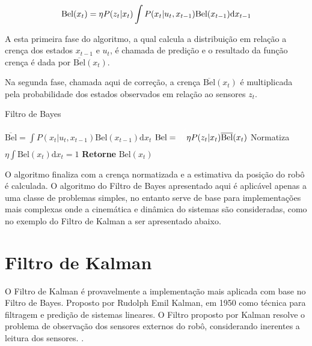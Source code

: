 \begin{equation}
    \label{eq:bayes2}
    \text{\text{Bel}}(x_t) = \eta P(z_t| x_t) \int P(x_t| u_t, x_{t-1}) \text{Bel}(x_{t-1})\text{d}x_{t-1}
\end{equation}


A esta primeira fase do algoritmo, a qual calcula a distribuição em relação a crença dos estados $x_{t-1}$ e $u_t$, é chamada de predição e o resultado da função crença é dada por $\overline{\text{Bel}}(x_t)$.

Na segunda fase, chamada aqui de correção, a crença $\overline{\text{Bel}}(x_t)$ é multiplicada pela probabilidade dos estados observados em relação ao sensores $z_t$.

\begin{algorithm}[H]
    \caption{Filtro de Bayes}
    \begin{algorithmic}[1]
        \State $\overline{\text{Bel}}= \displaystyle\int P(x_t| u_t, x_{t-1})\text{Bel}(x_{t-1})\text{d}x_t$
    \EndProcedure
        \State ${\text{Bel}}= \displaystyle\textcolor{white}{\int}  \eta P(z_t| x_{t})\overline{\text{Bel}}(x_{t})$
    \EndProcedure
    \State Normatiza $\eta \displaystyle\int \text{Bel}(x_t)\text{d}x_t = 1$
    \State \textbf{Retorne} $\text{Bel}(x_t)$

    \end{algorithmic}
\end{algorithm}

O algoritmo finaliza com a crença normatizada e a estimativa da posição do robô é calculada. O algoritmo do Filtro de Bayes apresentado aqui é aplicável apenas a uma classe de problemas simples, no entanto serve de base para implementações mais complexas onde a cinemática e dinâmica do sistemas são consideradas, como no exemplo do Filtro de Kalman a ser apresentado abaixo.

\section{Filtro de Kalman}

O Filtro de Kalman é provavelmente a implementação mais aplicada com base no Filtro de Bayes. Proposto por Rudolph Emil Kalman, em 1950 como técnica para filtragem e predição de sistemas lineares. O Filtro proposto por Kalman resolve o problema de observação dos sensores externos do robô, considerando inerentes a leitura dos sensores. \cite{thrun2006probalistic,romero2014robotica}.

